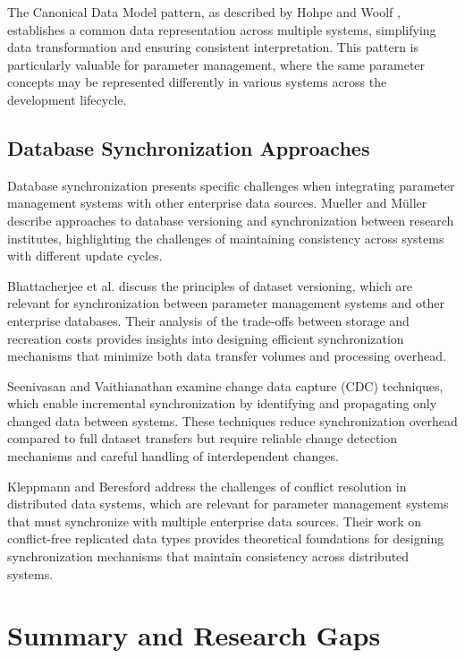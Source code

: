 The Canonical Data Model pattern, as described by Hohpe and Woolf \cite{hohpe2002enterprise}, establishes a common data representation across multiple systems, simplifying data transformation and ensuring consistent interpretation. This pattern is particularly valuable for parameter management, where the same parameter concepts may be represented differently in various systems across the development lifecycle.

\subsection{Database Synchronization Approaches}
\label{subsec:database-synchronization}

Database synchronization presents specific challenges when integrating parameter management systems with other enterprise data sources. Mueller and Müller \cite{mueller2018conception} describe approaches to database versioning and synchronization between research institutes, highlighting the challenges of maintaining consistency across systems with different update cycles.

Bhattacherjee et al. \cite{bhattacherjee2015principles} discuss the principles of dataset versioning, which are relevant for synchronization between parameter management systems and other enterprise databases. Their analysis of the trade-offs between storage and recreation costs provides insights into designing efficient synchronization mechanisms that minimize both data transfer volumes and processing overhead.

Seenivasan and Vaithianathan \cite{seenivasan2023real} examine change data capture (CDC) techniques, which enable incremental synchronization by identifying and propagating only changed data between systems. These techniques reduce synchronization overhead compared to full dataset transfers but require reliable change detection mechanisms and careful handling of interdependent changes.

Kleppmann and Beresford \cite{kleppmann2017conflict} address the challenges of conflict resolution in distributed data systems, which are relevant for parameter management systems that must synchronize with multiple enterprise data sources. Their work on conflict-free replicated data types provides theoretical foundations for designing synchronization mechanisms that maintain consistency across distributed systems.

\section{Summary and Research Gaps}
\label{sec:summary-gaps}

